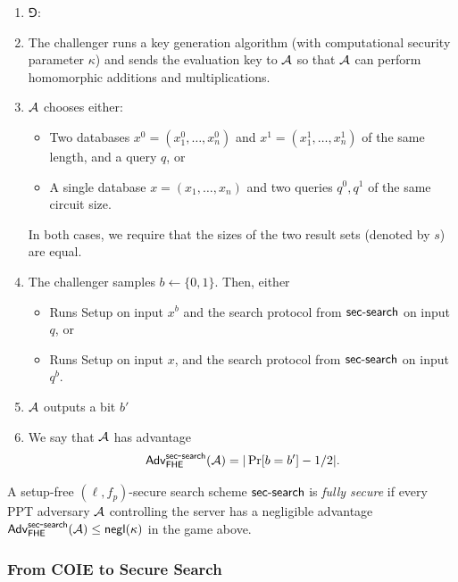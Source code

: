 \begin{enumerate}
\item[] \hspace{-2em} $\Game$:

\item The challenger runs a key generation algorithm (with computational security
parameter $\kappa$) and sends the evaluation key to $\mathcal{A}$ so that $\mathcal{A}$
can perform homomorphic additions and multiplications. 

\item $\mathcal{A}$ chooses either:
    \begin{itemize}
        \item Two databases $x^0 = (x^0_1, \ldots, x^0_n)$ and $x^1 =
        (x^1_1, \ldots, x^1_n)$ of the same length, and a query $q$, or  
        \item A single database $x = (x_1, \ldots, x_n)$ and two queries
        $q^0, q^1$ of the same circuit size. 
    \end{itemize}
    In both cases, we require that the sizes of the two result sets (denoted by $s$) are equal.
    
    \item The challenger samples $b \leftarrow \{0,1\}$.  Then, either 
    \begin{itemize}
        \item Runs Setup on input $x^b$ and the search protocol from $\mathsf{sec\mbox{-}search}$ on input $q$, or
        \item Runs Setup on input $x$, and the search protocol from
        $\mathsf{sec\mbox{-}search}$ on input $q^b$.
    \end{itemize}
    \item $\mathcal{A}$ outputs a bit $b'$
    \item We say that $\mathcal{A}$ has advantage $$\mathsf{Adv}_{\mathsf{FHE}}^{\mathsf{sec\mbox{-}search}}(\mathcal{A}) = |\Pr[b=b']-1/2|.$$
\end{enumerate}

\begin{definition}
A setup-free $(\ell, f_p)$-secure search scheme $\mathsf{sec\mbox{-}search}$ is \emph{fully
secure} if every PPT adversary $\mathcal{A}$ controlling the server has a
negligible advantage $\mathsf{Adv}_{\mathsf{FHE}}^{\mathsf{sec\mbox{-}search}}(\mathcal{A}) \le \mathsf{negl}(\kappa)$ in the game above.
\end{definition}

\subsubsection{From COIE to Secure Search}

